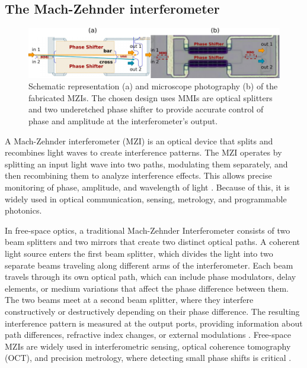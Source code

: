 \subsection{The Mach-Zehnder interferometer}\label{sub:the_mach-zehnder-interferometer} %

\begin{figure}[h]
	\begin{center}
		\includegraphics{figures/ch2-mzi.pdf}
	\end{center}
	\caption{Schematic representation (a) and microscope photography (b) of the fabricated MZIs.
		The chosen design uses MMIs are optical splitters and two underetched phase shifter to provide accurate control of phase and amplitude at the interferometer's output.
	}\label{fig:ch2-mzi}
\end{figure}

A Mach-Zehnder interferometer (MZI) is an optical device that splits and recombines light waves to create interference patterns.
The MZI operates by splitting an input light wave into two paths, modulating them separately, and then recombining them to analyze interference effects.
This allows precise monitoring of phase, amplitude, and wavelength of light \cite{mach_ueber_1892,zehnder_neuer_1891}.
Because of this, it is widely used in optical communication, sensing, metrology, and programmable photonics.

In free-space optics, a traditional Mach-Zehnder Interferometer consists of two beam splitters and two mirrors that create two distinct optical paths.
A coherent light source enters the first beam splitter, which divides the light into two separate beams traveling along different arms of the interferometer.
Each beam travels through its own optical path, which can include phase modulators, delay elements, or medium variations that affect the phase difference between them.
The two beams meet at a second beam splitter, where they interfere constructively or destructively depending on their phase difference.
The resulting interference pattern is measured at the output ports, providing information about path differences, refractive index changes, or external modulations \cite{saleh_wave_1991}.
Free-space MZIs are widely used in interferometric sensing, optical coherence tomography (OCT), and precision metrology, where detecting small phase shifts is critical \cite{hariharan_interferometry_2005,fujimoto_optical_2003}.


